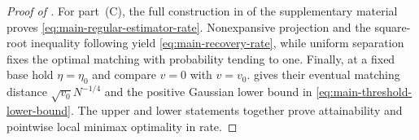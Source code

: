 \begin{proof}[Proof of ]
For part~\textup{(C)}, the full construction in
 of the supplementary material proves \eqref{eq:main-regular-estimator-rate}.  Nonexpansive
projection and the square-root inequality following
 yield \eqref{eq:main-recovery-rate}, while
uniform separation fixes the optimal matching with probability tending to
one.  Finally, at a fixed base hold \(\eta=\eta_0\) and compare \(v=0\) with
\(v=v_0\).   gives their eventual
matching distance \(\sqrt{v_0}N^{-1/4}\) and the positive Gaussian lower
bound in \eqref{eq:main-threshold-lower-bound}.  The upper and lower statements together prove
attainability and pointwise local minimax optimality in rate.
\end{proof}
